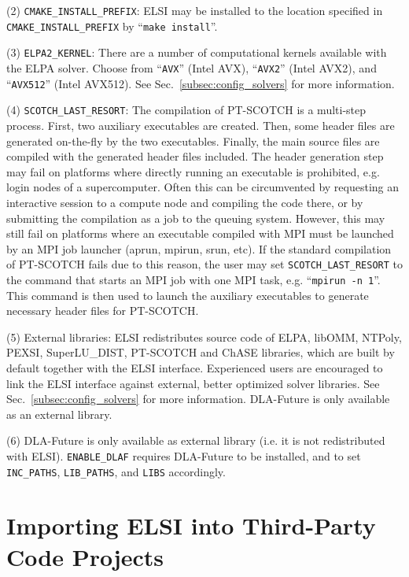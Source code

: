 \documentclass{report}
\begin{document}
(2) \texttt{CMAKE\_INSTALL\_PREFIX}: ELSI may be installed to the location specified in \texttt{CMAKE\_INSTALL\_PREFIX} by ``\texttt{make install}''.

(3) \texttt{ELPA2\_KERNEL}: There are a number of computational kernels available with the ELPA solver. Choose from ``\texttt{AVX}'' (Intel AVX), ``\texttt{AVX2}'' (Intel AVX2), and ``\texttt{AVX512}'' (Intel AVX512). See Sec.~\ref{subsec:config_solvers} for more information.

(4) \texttt{SCOTCH\_LAST\_RESORT}: The compilation of PT-SCOTCH is a multi-step process. First, two auxiliary executables are created. Then, some header files are generated on-the-fly by the two executables. Finally, the main source files are compiled with the generated header files included. The header generation step may fail on platforms where directly running an executable is prohibited, e.g. login nodes of a supercomputer. Often this can be circumvented by requesting an interactive session to a compute node and compiling the code there, or by submitting the compilation as a job to the queuing system. However, this may still fail on platforms where an executable compiled with MPI must be launched by an MPI job launcher (aprun, mpirun, srun, etc). If the standard compilation of PT-SCOTCH fails due to this reason, the user may set \texttt{SCOTCH\_LAST\_RESORT} to the command that starts an MPI job with one MPI task, e.g. ``\texttt{mpirun -n 1}''. This command is then used to launch the auxiliary executables to generate necessary header files for PT-SCOTCH.

(5) External libraries: ELSI redistributes source code of ELPA, libOMM, NTPoly, PEXSI, SuperLU\_DIST, PT-SCOTCH and ChASE libraries, which are built by default together with the ELSI interface. Experienced users are encouraged to link the ELSI interface against external, better optimized solver libraries. See Sec.~\ref{subsec:config_solvers} for more information. DLA-Future is only available as an external library.

(6) DLA-Future is only available as external library (i.e. it is not redistributed with ELSI). \texttt{ENABLE\_DLAF} requires DLA-Future to be installed, and to set \texttt{INC\_PATHS}, \texttt{LIB\_PATHS}, and \texttt{LIBS} accordingly.

\section{Importing ELSI into Third-Party Code Projects}
\label{sec:import}
\end{document}
